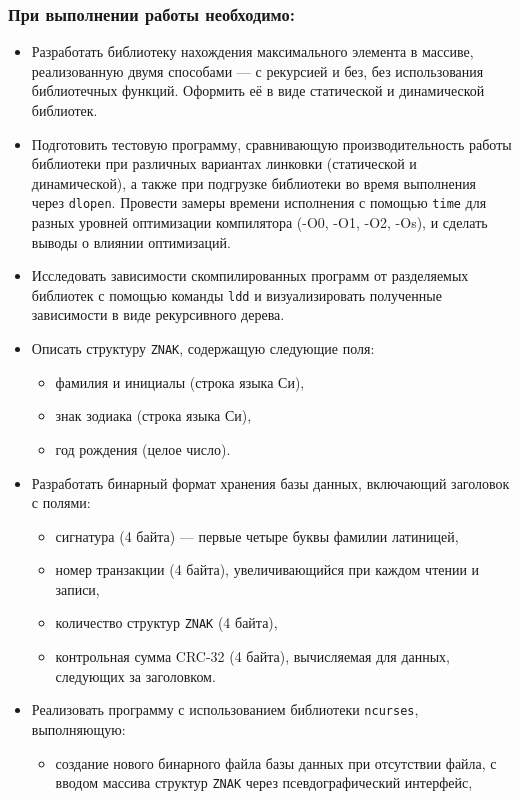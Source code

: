 \subsubsection*{При выполнении работы необходимо:}
\begin{itemize}
\item Разработать библиотеку нахождения максимального элемента в массиве, реализованную двумя способами — с рекурсией и без, без использования библиотечных функций. Оформить её в виде статической и динамической библиотек.
\item Подготовить тестовую программу, сравнивающую производительность работы библиотеки при различных вариантах линковки (статической и динамической), а также при подгрузке библиотеки во время выполнения через \texttt{dlopen}. Провести замеры времени исполнения с помощью \texttt{time} для разных уровней оптимизации компилятора (-O0, -O1, -O2, -Os), и сделать выводы о влиянии оптимизаций.
\item Исследовать зависимости скомпилированных программ от разделяемых библиотек с помощью команды \texttt{ldd} и визуализировать полученные зависимости в виде рекурсивного дерева.
\item Описать структуру \texttt{ZNAK}, содержащую следующие поля:
\begin{itemize}
\item фамилия и инициалы (строка языка Си),
\item знак зодиака (строка языка Си),
\item год рождения (целое число).
\end{itemize}
\item Разработать бинарный формат хранения базы данных, включающий заголовок с полями:
\begin{itemize}
\item сигнатура (4 байта) — первые четыре буквы фамилии латиницей,
\item номер транзакции (4 байта), увеличивающийся при каждом чтении и записи,
\item количество структур \texttt{ZNAK} (4 байта),
\item контрольная сумма CRC-32 (4 байта), вычисляемая для данных, следующих за заголовком.
\end{itemize}
\item Реализовать программу с использованием библиотеки \texttt{ncurses}, выполняющую:
\begin{itemize}
\item создание нового бинарного файла базы данных при отсутствии файла, с вводом массива структур \texttt{ZNAK} через псевдографический интерфейс,

\end{itemize}
\end{itemize}
